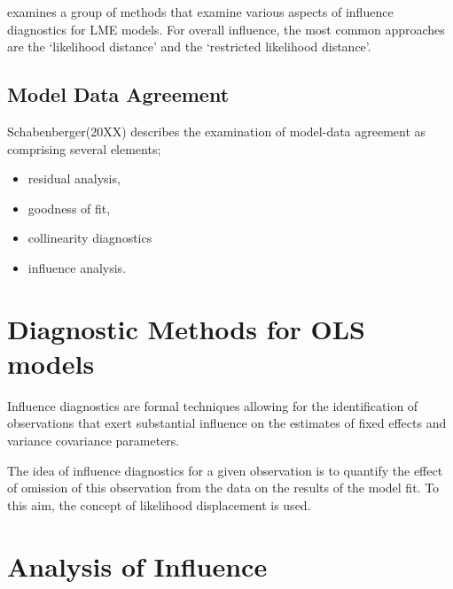 \documentclass[12pt, a4paper]{article}
\begin{document}
\citet{west} examines a group of methods that examine various aspects of influence diagnostics for LME models.
For overall influence, the most common approaches are the `likelihood distance' and the `restricted likelihood distance'.



\subsection{Model Data Agreement}
Schabenberger(20XX) describes the examination of model-data agreement as comprising several elements; 
\begin{itemize}
	\item residual analysis, 
	\item goodness of fit, 
	\item collinearity diagnostics
	\item influence analysis.
\end{itemize}

\section*{Diagnostic Methods for OLS models}
Influence diagnostics are formal techniques allowing for the identification of observations that exert substantial influence on the estimates of fixed effects and variance covariance parameters. 
	
The idea of influence diagnostics for a given observation is to quantify the effect of omission of this observation from the data on the results of the model fit. To this aim, the concept of likelihood displacement is used. 
	
	


\section{Analysis of  Influence}


\end{document}
